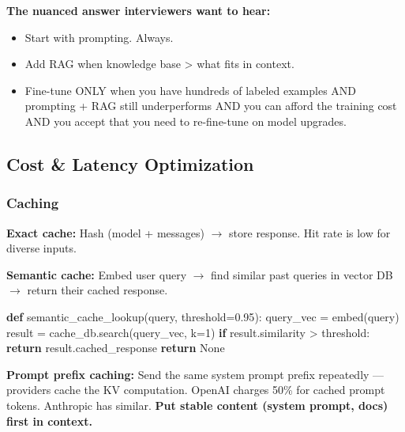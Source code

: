 \documentclass[11pt]{article}
\providecommand{\tightlist}{\setlength{\itemsep}{1pt}\setlength{\parskip}{0pt}}
\newenvironment{Shaded}{\begin{snugshade}}{\end{snugshade}}
\newcommand{\ControlFlowTok}[1]{\textcolor[rgb]{0.99,0.74,0.29}{\textbf{#1}}}
\newcommand{\DecValTok}[1]{\textcolor[rgb]{0.96,0.45,0.00}{#1}}
\newcommand{\FloatTok}[1]{\textcolor[rgb]{0.96,0.45,0.00}{#1}}
\newcommand{\KeywordTok}[1]{\textcolor[rgb]{0.81,0.81,0.76}{\textbf{#1}}}
\newcommand{\NormalTok}[1]{\textcolor[rgb]{0.81,0.81,0.76}{#1}}
\newcommand{\OperatorTok}[1]{\textcolor[rgb]{0.81,0.81,0.76}{#1}}
\newcommand{\VariableTok}[1]{\textcolor[rgb]{0.15,0.68,0.68}{#1}}
\begin{document}
\textbf{The nuanced answer interviewers want to hear:}

\begin{itemize}
\tightlist
\item
  Start with prompting. Always.
\item
  Add RAG when knowledge base \textgreater{} what fits in context.
\item
  Fine-tune ONLY when you have hundreds of labeled examples AND prompting + RAG still underperforms AND you can afford the training cost AND you accept that you need to re-fine-tune on model upgrades.
\end{itemize}

\subsection{Cost \& Latency Optimization}\label{cost--latency-optimization}

\subsubsection{Caching}\label{caching}

\textbf{Exact cache:} Hash (model + messages) \(\rightarrow\) store response. Hit rate is low for diverse inputs.

\textbf{Semantic cache:} Embed user query \(\rightarrow\) find similar past queries in vector DB \(\rightarrow\) return their cached response.


\begin{Shaded}
\begin{Highlighting}[]
\KeywordTok{def}\NormalTok{ semantic\_cache\_lookup(query, threshold}\OperatorTok{=}\FloatTok{0.95}\NormalTok{):}
\NormalTok{    query\_vec }\OperatorTok{=}\NormalTok{ embed(query)}
\NormalTok{    result }\OperatorTok{=}\NormalTok{ cache\_db.search(query\_vec, k}\OperatorTok{=}\DecValTok{1}\NormalTok{)}
    \ControlFlowTok{if}\NormalTok{ result.similarity }\OperatorTok{\textgreater{}}\NormalTok{ threshold:}
        \ControlFlowTok{return}\NormalTok{ result.cached\_response}
    \ControlFlowTok{return} \VariableTok{None}
\end{Highlighting}
\end{Shaded}

\textbf{Prompt prefix caching:} Send the same system prompt prefix repeatedly --- providers cache the KV computation. OpenAI charges 50\% for cached prompt tokens. Anthropic has similar. \textbf{Put stable content (system prompt, docs) first in context.}
\end{document}
